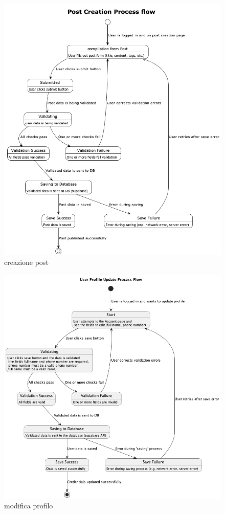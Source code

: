 \documentclass{article}
\begin{document}
\begin{figure}[h]
    \lefting
    \includegraphics[width=1.3\textwidth]{creazione_post_flow}
    \caption{creazione post}
\end{figure}

\begin{figure}[h]
    \lefting
    \includegraphics[width=1.3\textwidth]{modifica_profilo_flow}
    \caption{modifica profilo}
\end{figure}
\end{document}
